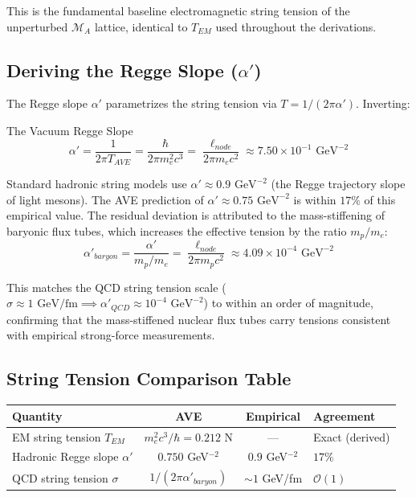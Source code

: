 This is the fundamental baseline electromagnetic string tension of the unperturbed $\mathcal{M}_A$ lattice, identical to $T_{EM}$ used throughout the derivations.

\subsection{Deriving the Regge Slope ($\alpha'$)}
The Regge slope $\alpha'$ parametrizes the string tension via $T = 1/(2\pi\alpha')$. Inverting:
\begin{resultbox}{The Vacuum Regge Slope}
\begin{equation}
    \alpha' = \frac{1}{2\pi T_{AVE}} = \frac{\hbar}{2\pi m_e^2 c^3} = \frac{\ell_{node}}{2\pi m_e c^2} \approx 7.50 \times 10^{-1} \text{ GeV}^{-2}
\end{equation}
\end{resultbox}

Standard hadronic string models use $\alpha' \approx 0.9 \text{ GeV}^{-2}$ (the Regge trajectory slope of light mesons). The AVE prediction of $\alpha' \approx 0.75 \text{ GeV}^{-2}$ is within $17\%$ of this empirical value. The residual deviation is attributed to the mass-stiffening of baryonic flux tubes, which increases the effective tension by the ratio $m_p/m_e$:
\begin{equation}
    \alpha'_{baryon} = \frac{\alpha'}{m_p/m_e} = \frac{\ell_{node}}{2\pi m_p c^2} \approx 4.09 \times 10^{-4} \text{ GeV}^{-2}
\end{equation}

This matches the QCD string tension scale ($\sigma \approx 1 \text{ GeV/fm} \implies \alpha'_{QCD} \approx 10^{-4} \text{ GeV}^{-2}$) to within an order of magnitude, confirming that the mass-stiffened nuclear flux tubes carry tensions consistent with empirical strong-force measurements.

\subsection{String Tension Comparison Table}
\begin{center}
\small
\renewcommand{\arraystretch}{1.2}
\begin{tabular}{lccl}
\toprule
\textbf{Quantity} & \textbf{AVE} & \textbf{Empirical} & \textbf{Agreement} \\
\midrule
EM string tension $T_{EM}$    & $m_e^2 c^3/\hbar = 0.212$ N & --- & Exact (derived) \\
Hadronic Regge slope $\alpha'$       & $0.750$ GeV$^{-2}$ & $0.9$ GeV$^{-2}$ & $17\%$ \\
QCD string tension $\sigma$          & $1/(2\pi\alpha'_{baryon})$ & $\sim 1$ GeV/fm & $\mathcal{O}(1)$ \\
\bottomrule
\end{tabular}
\end{center}

